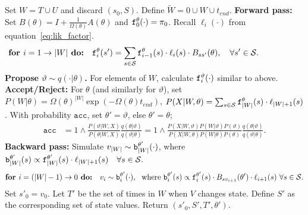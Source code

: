 \begin{algorithm}[H]
\begin{algorithmic}[1]
      \State 
      Set $W = T \cup U$ and discard $(s_0,S)$. Define $\tilde{W} = 0 \cup W \cup t_{end}$.
    \State 
    \textbf{Forward pass:}
    Set $B(\theta) = I + \frac{1}{\Omega(\theta)}A(\theta)$ and
    $\mathtt{f}^\theta_0(\cdot) = \pi_0$. Recall $\ell_i(\cdot)$ from equation~\eqref{eq:lik_factor}.
\vspace{-.25in}
$$\textbf{for } i=1\rightarrow |{W}|\textbf{ do:} \quad \mathtt{f}^{\theta}_i(s') = \sum_{s \in {\mathcal S}} \mathtt{f}^\theta_{i-1}(s)\cdot \ell_{i}(s) \cdot B_{ss'}(\theta), \quad \forall s' \in {\mathcal S}.\qquad\qquad\quad $$
    \State \textbf{Propose $\vartheta \sim q(\cdot| \theta)$.}
    For elements of ${W}$, calculate $\mathtt{f}^\vartheta_i(\cdot)$ similar to above.
      \State \textbf{Accept/Reject:} 
      For $\theta$ (and similarly for $\vartheta$), set  
      $P(W|\theta) = \Omega(\theta)^{|W|}\exp(-\Omega(\theta)t_{end})$, 
      $P(X|W,\theta) = \sum_{s \in {\mathcal S}} \mathtt{f}_{|{W}|}^\theta(s)\cdot\ell_{|{W}|+1}(s)$.
      With probability $\texttt{acc}$, set $\theta' = \vartheta$, else $\theta'=\theta$; %
          \begin{align}
            \label{eq:ncp_acc}
            \texttt{acc} &=  1 \wedge \frac{P(\vartheta|W, X)}{P(\theta|W, X)} \frac{q(\theta|\vartheta)}{q(\vartheta|\theta)}
          =  1 \wedge \frac{P(X| W,\vartheta) P(W | \vartheta)P(\vartheta)}
            {P(X|W, \theta)P(W | \theta)P(\theta)} \frac{q(\theta|\vartheta)}{q(\vartheta|\theta)}.
          \end{align}
    \State %
    \textbf{Backward pass:}
    Simulate $v_{|W|} \sim \mathtt{b}^{\theta'}_{|W|}(\cdot)$, where $\mathtt{b}^{\theta'}_{|W|}(s) \propto \mathtt{f}^{\theta'}_{|W|}(s)\cdot\ell_{|W|+1}(s) \quad \forall s \in {\mathcal S}.$ 
\vspace{-.25in}
    $$ \textbf{for } i=(|W|-1)\rightarrow 0\textbf{ do:} \quad v_i \sim \mathtt{b}^{\theta'}_i(\cdot),\ \ \text{where } 
    \mathtt{b}^{\theta'}_i(s) \propto \mathtt{f}^{\theta'}_i(s)\cdot B_{sv_{i+1}}(\theta') \cdot \ell_{i+1}(s)  \ \forall s \in {\mathcal S}.$$
    \State Set $s'_0=v_0$. Let $T'$ be the set of times in $W$ when $V$ changes state. Define $S'$ as the corresponding set of state values. Return $(s'_0, S', T', \theta')$.
\end{algorithmic}
\end{algorithm}
